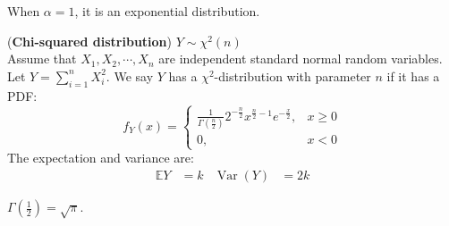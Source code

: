 \documentclass{huhtakm-template-book}
\newcommand{\expect}{\mathbb{E}}
\DeclareMathOperator{\Var}{Var}
\begin{document}
\begin{rem}
	When $\alpha=1$, it is an exponential distribution.
\end{rem}
\begin{eg}(\textbf{Chi-squared distribution}) $Y\sim\chi^{2}(n)$\\
	Assume that $X_{1},X_{2},\cdots,X_{n}$ are independent standard normal random variables. Let $Y=\sum_{i=1}^{n}X_{i}^{2}$. We say $Y$ has a $\chi^{2}$-distribution with parameter $n$ if it has a PDF:
	\begin{equation*}
		f_{Y}(x)=\begin{cases}
			\frac{1}{\Gamma(\frac{n}{2})}2^{-\frac{n}{2}}x^{\frac{n}{2}-1}e^{-\frac{x}{2}}, &x\geq 0\\
			0, &x<0
		\end{cases}
	\end{equation*}
	The expectation and variance are:
	\begin{align*}
		\expect{Y}&=k & \Var(Y)&=2k
	\end{align*}
\end{eg}
\begin{rem}
	$\Gamma(\frac{1}{2})=\sqrt{\pi}$.
\end{rem}
\end{document}
